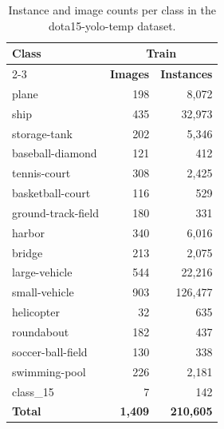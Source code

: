 \begin{table}[htbp]
\centering
\caption{Instance and image counts per class in the dota15-yolo-temp dataset.}
\label{tab:dota15_yolo_temp_counts}
\begin{tabular}{lrr}
\toprule
\textbf{Class} & \multicolumn{2}{c}{Train} \\
\cmidrule(lr){2-3}
 & \textbf{Images} & \textbf{Instances} \\
\midrule
plane & 198 & 8,072 \\
ship & 435 & 32,973 \\
storage-tank & 202 & 5,346 \\
baseball-diamond & 121 & 412 \\
tennis-court & 308 & 2,425 \\
basketball-court & 116 & 529 \\
ground-track-field & 180 & 331 \\
harbor & 340 & 6,016 \\
bridge & 213 & 2,075 \\
large-vehicle & 544 & 22,216 \\
small-vehicle & 903 & 126,477 \\
helicopter & 32 & 635 \\
roundabout & 182 & 437 \\
soccer-ball-field & 130 & 338 \\
swimming-pool & 226 & 2,181 \\
class\_15 & 7 & 142 \\
\midrule
\textbf{Total} & \textbf{1,409} & \textbf{210,605} \\
\bottomrule
\end{tabular}
\end{table}

